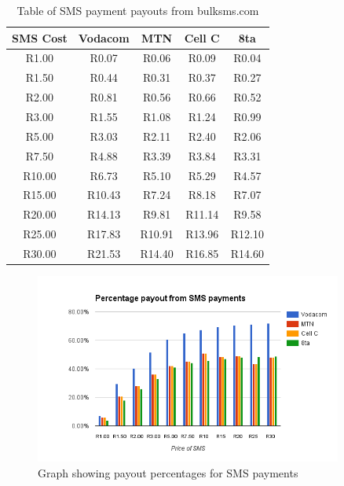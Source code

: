 \begin{table}
	\begin{center}
		\begin{tabular}	{ | c | c | c | c | c |}
		\hline
		SMS Cost & Vodacom & MTN & Cell C & 8ta \\ \hline
		R1.00 &	R0.07 &	R0.06 &	R0.09 &	R0.04 \\ \hline 
		R1.50 &	R0.44 &	R0.31 &	R0.37 &	R0.27 \\ \hline
		R2.00 &	R0.81 &	R0.56 &	R0.66 &	R0.52 \\ \hline
		R3.00 &	R1.55 &	R1.08 &	R1.24 &	R0.99 \\ \hline
		R5.00 &	R3.03 &	R2.11 &	R2.40 &	R2.06 \\ \hline
		R7.50 &	R4.88 &	R3.39 &	R3.84 &	R3.31 \\ \hline
		R10.00 & R6.73 & R5.10 & R5.29 & R4.57 \\ \hline
		R15.00 & R10.43 & R7.24 & R8.18 & R7.07 \\ \hline
		R20.00 & R14.13 & R9.81 & R11.14 & R9.58 \\ \hline
		R25.00 & R17.83 & R10.91 & R13.96 & R12.10 \\ \hline
		R30.00 & R21.53 & R14.40 &	R16.85 & R14.60 \\ \hline
	 
		\end{tabular}
		\caption{Table of SMS payment payouts from bulksms.com \cite{bulksms.com}} 
		\label{tbl:sms_prices}
	\end{center}
\end{table}

\begin{figure}
  \centering
    \includegraphics[width=0.9\textwidth]{figs/sms_percentage.png}
   \caption{Graph showing payout percentages for SMS payments} 
   \label{fig:sms_percentage}
\end{figure}

